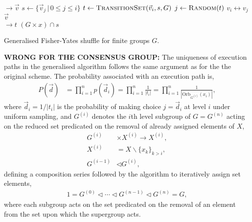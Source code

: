 \documentclass[twocolumn, aps, amsmath, amssymb, nofootinbib, superscriptaddress, longbibliography, floatfix, eqsecnum, rmp]{revtex4-2}
\let\oldalgorithmic\algorithmic
\let\endoldalgorithmic\endalgorithmic
\renewenvironment{algorithmic}
{\begin{adjustwidth}{-1em}{}\oldalgorithmic}
{\endoldalgorithmic\end{adjustwidth}}
\begin{document}

\begin{algorithm}[H]
\begin{algorithmic}
 $\to \vec{v}$
	 
		\State $s \gets \{\vec{v}_j\,|\, 0\leq j\leq i\}$ 
		\State $t \gets \textsc{TransitionSet}(\vec{v}_i,s,G)$ 
		\State $j \gets \textsc{Random}(t)$ 
		\State $v_i\leftrightarrow v_j$ 
	\EndFor
	\State \Return $\vec{v}$
\EndFunction
\\
 $\to t$ 
	\State \Return $(G\times x) \cap s$ 
\EndFunction
\end{algorithmic}	
\caption{Generalised Fisher-Yates shuffle for finite groups $G$.}\label{alg:fisher_yates_general}
\end{algorithm}

\textbf{WRONG FOR THE CONSENSUS GROUP:} The uniqueness of execution paths in the generalised algorithm follows the same argument as for the the original scheme. The probability associated with an execution path is,
\begin{align} \label{eq:group_order_shuffle}
	P(\vec{d}) &= \prod_{i=1}^{n} p(\vec{d}_i) = \prod_{i=1}^{n} \frac{1}{|t_i|} = \prod_{i=1}^{n} \frac{1}{|\mathrm{Orb}_{G^{(i)}}(x_i)|},
\end{align}
where \mbox{$\vec{d}_i=1/|t_i|$} is the probability of making choice \mbox{$j=\vec{d}_i$} at level $i$ under uniform sampling, and $G^{(i)}$ denotes the $i$th level subgroup of $G=G^{(n)}$ acting on the reduced set predicated on the removal of already assigned elements of $X$,
\begin{align} \label{eq:subgroup_struct}
	G^{(i)} &\times X^{(i)} \to X^{(i)},\nonumber\\
	X^{(i)} &= X\backslash\{x_{k}\}_{k>i},\nonumber\\
	G^{(i-1)} &\triangleleft G^{(i)},
\end{align}
defining a composition series followed by the algorithm to iteratively assign set elements,
\begin{align}
	1 = G^{(0)} \triangleleft \cdots \triangleleft G^{(n-1)} \triangleleft G^{(n)} = G,
\end{align}
where each subgroup acts on the set predicated on the removal of an element from the set upon which the supergroup acts.
\end{document}
